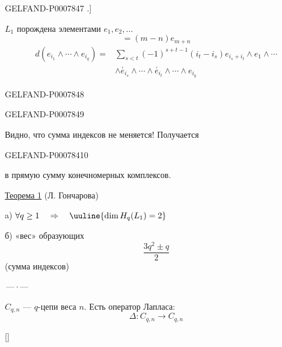 \begin{GelfandAdjacentEvidence}{GELFAND-P000784}{7}
.]

\(L_1\) порождена элементами \(e_1,e_2,\ldots\)
\begin{equation}
[e_n,e_m]=(m-n)e_{m+n}\tag{10}
\end{equation}
\begin{equation}
\begin{aligned}
d(e_{i_1}\wedge\cdots\wedge e_{i_q})
={}&\sum_{s<t}(-1)^{s+t-1}(i_t-i_s)e_{i_s+i_t}\wedge e_1\wedge\cdots\\
&\wedge\overset{'}{e}_{i_s}\wedge\cdots\wedge\overset{'}{e}_{i_t}
\wedge\cdots\wedge e_{i_q}
\end{aligned}\tag{11}
\end{equation}
\end{GelfandAdjacentEvidence}
\begin{GelfandAdjacentEvidence}{GELFAND-P000784}{8}

\end{GelfandAdjacentEvidence}
\begin{GelfandAdjacentEvidence}{GELFAND-P000784}{9}


Видно, что сумма индексов не меняется! Получается
\end{GelfandAdjacentEvidence}
\begin{GelfandAdjacentEvidence}{GELFAND-P000784}{10}

в прямую сумму конечномерных комплексов.

\underline{Теорема 1} (Л. Гончарова)

a) \(\forall q\geq1\quad\Rightarrow\quad\uuline{\dim H_q(L_1)=2}\)

б) «вес» образующих
\[
\frac{3q^2\pm q}{2}
\]
(сумма индексов)

\begin{center}\(\text{---}\,\cdot\,\text{---}\)\end{center}

\(C_{q,n}\) --- \(q\)-цепи веса \(n\). Есть оператор Лапласа:
\begin{equation}
\Delta:C_{q,n}\longrightarrow C_{q,n}\tag{12}
\end{equation}

[]
\end{GelfandAdjacentEvidence}


